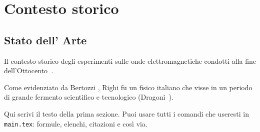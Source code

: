 \chapter{Contesto storico}
\section{Stato dell' Arte}
Il contesto storico degli esperimenti sulle
onde elettromagnetiche condotti alla fine dell'Ottocento~\cite{righi1897ottica}.

Come evidenziato da Bertozzi \cite{bertozzi2020augusto}, Righi fu un fisico italiano che visse in un periodo 
di grande fermento scientifico e tecnologico (Dragoni~\cite{dragonirighi2023}).

Qui scrivi il testo della prima sezione. Puoi usare tutti i comandi
che useresti in \texttt{main.tex}: formule, elenchi, citazioni e così via.
